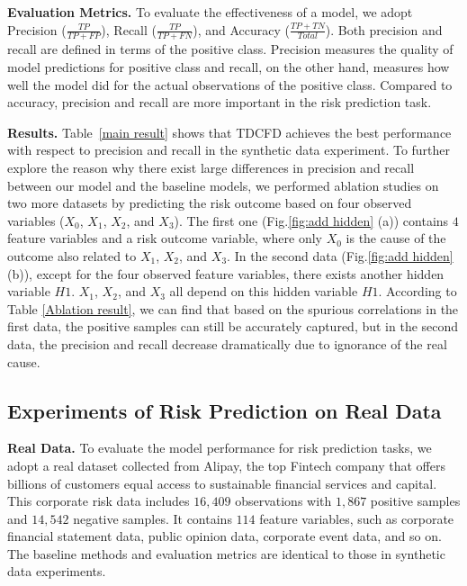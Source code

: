 \documentclass[letterpaper]{article} %
\theoremstyle{definition}
\theoremstyle{remark}
\begin{document}
\noindent\textbf{Evaluation Metrics.}
To evaluate the effectiveness of a model, we adopt Precision ($\frac{TP}{TP+FP}$), Recall ($\frac{TP}{TP+FN}$), and Accuracy ($\frac{TP+TN}{Total}$). Both precision and recall are defined in terms of the positive class. Precision measures the quality of model predictions for positive class and recall, on the other hand, measures how well the model did for the actual observations of the positive class. Compared to accuracy, precision and recall are more important in the risk prediction task.


\noindent\textbf{Results.} 
Table~\ref{main result} shows that TDCFD achieves the best performance with respect to precision and recall in the synthetic data experiment. To further explore the reason why there exist large differences in precision and recall between our model and the baseline models, we performed ablation studies on two more datasets by predicting the risk outcome based on four observed variables ($X_0$, $X_1$, $X_2$, and $X_3$). The first one (Fig.\ref{fig:add hidden} (a)) contains $4$ feature variables and a risk outcome variable, where only $X_0$ is the cause of the outcome also related to $X_1$, $X_2$, and $X_3$. In the second data (Fig.\ref{fig:add hidden} (b)), except for the four observed feature variables, there exists another hidden variable $H1$. $X_1$, $X_2$, and $X_3$ all depend on this hidden variable $H1$. According to Table \ref{Ablation result}, we can find that based on the spurious correlations in the first data, the positive samples can still be accurately captured, but in the second data, the precision and recall decrease dramatically due to ignorance of the real cause.

\subsection{Experiments of Risk Prediction on Real Data}


\noindent\textbf{Real Data.} 
To evaluate the model performance for risk prediction tasks, we adopt a real dataset collected from Alipay, the top Fintech company that offers billions of customers equal access to sustainable financial services and capital. This corporate risk data includes $16,409$ observations with $1,867$ positive samples and $14,542$ negative samples. It contains $114$ feature variables, such as corporate financial statement data, public opinion data, corporate event data, and so on. The baseline methods and evaluation metrics are identical to those in synthetic data experiments.
\end{document}
